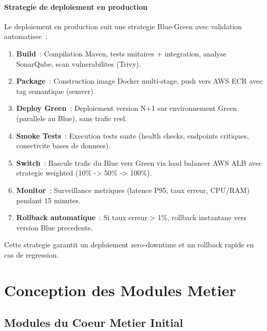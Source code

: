 \documentclass[12pt,a4paper]{report}
\begin{document}
\subsection{Strategie de deploiement en production}

Le deploiement en production suit une strategie Blue-Green avec validation
automatisee~:

\begin{enumerate}[leftmargin=2cm]
  \item \textbf{Build}~: Compilation Maven, tests unitaires + integration,
        analyse SonarQube, scan vulnerabilites (Trivy).
        
  \item \textbf{Package}~: Construction image Docker multi-stage,
        push vers AWS ECR avec tag semantique (semver).
        
  \item \textbf{Deploy Green}~: Deploiement version N+1 sur environnement
        Green (parallele au Blue), sans trafic reel.
        
  \item \textbf{Smoke Tests}~: Execution tests sante (health checks,
        endpoints critiques, conectivite bases de donnees).
        
  \item \textbf{Switch}~: Bascule trafic du Blue vers Green via load
        balancer AWS ALB avec strategie weighted (10\% -> 50\% -> 100\%).
        
  \item \textbf{Monitor}~: Surveillance metriques (latence P95, taux erreur,
        CPU/RAM) pendant 15 minutes.
        
  \item \textbf{Rollback automatique}~: Si taux erreur > 1\%, rollback
        instantane vers version Blue precedente.
\end{enumerate}

Cette strategie garantit un deploiement zero-downtime et un rollback
rapide en cas de regression.

\part{Conception des Modules Metier}

\chapter{Modules du Coeur Metier Initial}
\end{document}
